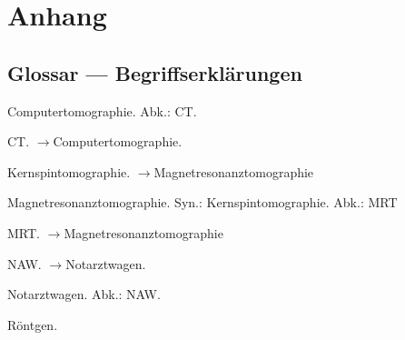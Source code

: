 

\part{Anhang}
\chapter{Glossar --- Begriffserklärungen}
{\mdseries
\label{bkm:LexComputertomographie}Computertomographie. Abk.: CT. }

{\mdseries
CT. ${\rightarrow}$Computertomographie.}

{\mdseries
Kernspintomographie. ${\rightarrow}$Magnetresonanztomographie}

{\mdseries
Magnetresonanztomographie. Syn.: Kernspintomographie. Abk.: MRT}

{\mdseries
MRT. ${\rightarrow}$Magnetresonanztomographie}

{\mdseries
NAW. ${\rightarrow}$Notarztwagen.}

{\mdseries
Notarztwagen. Abk.: NAW.}

{\mdseries
Röntgen. }

